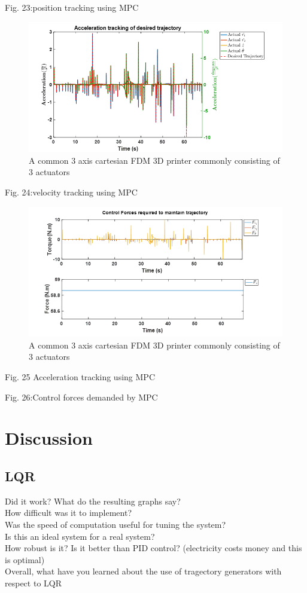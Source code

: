\documentclass{UoNMCHA}
\numberwithin{equation}{section}
\begin{document}
Fig. 23:position tracking using MPC

\begin{figure}[H]
	\begin{center}
		\includegraphics[width=.5\linewidth]{figs/Picture35}
		\caption{A  common 3 axis cartesian FDM 3D printer commonly consisting of 3 actuators}
		\label{figs/Picture35}
	\end{center}
\end{figure}

Fig. 24:velocity tracking using MPC

\begin{figure}[H]
	\begin{center}
		\includegraphics[width=.5\linewidth]{figs/Picture36}
		\caption{A  common 3 axis cartesian FDM 3D printer commonly consisting of 3 actuators}
		\label{figs/Picture36}
	\end{center}
\end{figure}

Fig. 25 Acceleration tracking using MPC

Fig. 26:Control forces demanded by MPC


\section{Discussion}

\subsection{LQR}

Did it work? What do the resulting graphs say?\\
How difficult was it to implement?\\
Was the speed of computation useful for tuning the system?\\
Is this an ideal system for a real system?\\
How robust is it? Is it better than PID control? (electricity costs money and this is optimal)\\
Overall, what have you learned about the use of tragectory generators with respect to LQR\\
\end{document}
